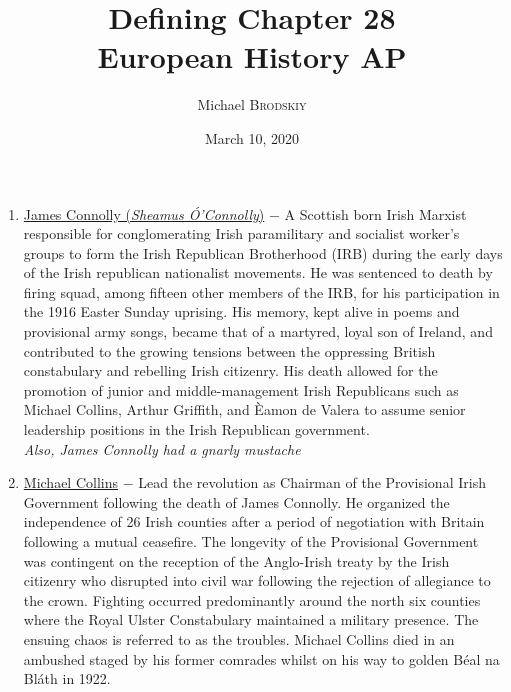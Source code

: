\documentclass[12pt]{article}
\newcommand{\subtitle}[1]{%
  \posttitle{%
    \par\end{center}
    \begin{center}\large#1\end{center}
    \vskip0.5em}%
}
\begin{document}

\author{Michael \textsc{Brodskiy}}
\title{Defining Chapter 28 \\European History AP}
\subtitle{Mrs Fisher}
\date{March 10, 2020}
\maketitle


\begin{flushleft}
\begin{enumerate}

\item  \underline{James Connolly (\emph{Sheamus \'O'Connolly})} $-$ A Scottish born Irish Marxist responsible for conglomerating Irish paramilitary and socialist worker's groups to form the Irish Republican Brotherhood (IRB) during the early days of the Irish republican nationalist movements. He was sentenced to death by firing squad, among fifteen other members of the IRB, for his participation in the 1916 Easter Sunday uprising. His memory, kept alive in poems and provisional army songs, became that of a martyred, loyal son of Ireland, and contributed to the growing tensions between the oppressing British constabulary and rebelling Irish citizenry. His death allowed for the promotion of junior and middle-management Irish Republicans such as Michael Collins, Arthur Griffith, and \`Eamon de Valera to assume senior leadership positions in the Irish Republican government. \\\vspace{8pt}\emph{Also, James Connolly had a gnarly mustache}

\item \underline{Michael Collins} $-$ Lead the revolution as Chairman of the Provisional Irish Government following the death of James Connolly. He organized the independence of 26 Irish counties after a period of negotiation with Britain following a mutual ceasefire. The longevity of the Provisional Government was contingent on the reception of the Anglo-Irish treaty by the Irish citizenry who disrupted into civil war following the rejection of allegiance to the crown. Fighting occurred predominantly around the north six counties where the Royal Ulster Constabulary maintained a military presence. The ensuing chaos is referred to as the troubles. Michael Collins died in an ambushed staged by his former comrades whilst on his way to golden B\'eal na Bl\'ath in 1922.


\end{enumerate}
\end{flushleft}
\end{document}
